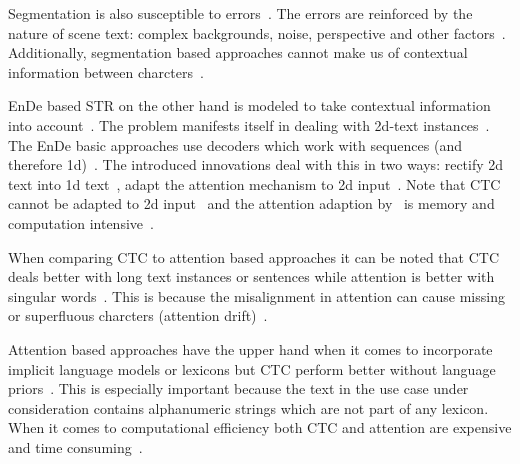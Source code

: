 Segmentation is also susceptible to errors~\citep{zhan_esir_2019,cheng_aon_2018,chen_text_2021}.
The errors are reinforced by the nature of scene text: complex backgrounds, noise, perspective
and other factors~\citep{hu_gtc_2020,chen_text_2021,baek_what_2019}.
Additionally, segmentation based approaches cannot make us of contextual information between
charcters~\citep{chen_text_2021}.

\ac{EnDe} based \ac{STR} on the other hand is modeled to take contextual information into
account~\citep{long_scene_2021,chen_text_2021}.
The problem manifests itself in dealing with 2d-text
instances~\citep{long_scene_2021,liao_scene_2018}.
The \ac{EnDe} basic approaches use decoders which work with sequences (and therefore
1d)~\citep{long_scene_2021,cheng_aon_2018}.
The introduced innovations deal with this in two ways: rectify 2d text into 1d
text~\citep{zhan_esir_2019,luo_multi-object_2019,shi_aster_2019,liu_char-net_2018}, adapt the
attention mechanism to 2d input~\citep{li_show_2019}.
Note that \ac{CTC} cannot be adapted to 2d input~\citep{cheng_focusing_2017,xie_aggregation_2019}
and the attention adaption by~\cite{li_show_2019} is memory and computation
intensive~\citep{xie_aggregation_2019}.

When comparing \ac{CTC} to attention based approaches it can be noted that \ac{CTC} deals better
with long text instances or sentences while attention is better with singular
words~\citep{cong_comparative_2019,chen_text_2021}.
This is because the misalignment in attention can cause missing or superfluous charcters (attention
drift)~\citep{bai_edit_2018,liao_scene_2018,cheng_focusing_2017}.

Attention based approaches have the upper hand when it comes to incorporate implicit language models
or lexicons but \ac{CTC} perform better without language priors~\citep{cong_comparative_2019}.
This is especially important because the text in the use case under consideration contains
alphanumeric strings which are not part of any lexicon.
When it comes to computational efficiency both \ac{CTC} and attention are expensive and time
consuming~\citep{chen_text_2021}.

